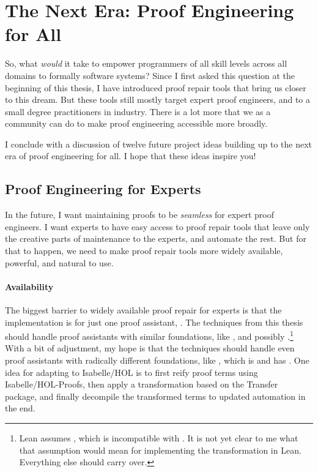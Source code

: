 \section*{The Next Era: Proof Engineering for All}



So, what \textit{would} it take to empower programmers of all skill levels across all domains to formally  software systems?
Since I first asked this question at the beginning of this thesis, I have introduced proof repair tools that bring us closer to this dream.
But these tools still mostly target expert proof engineers, and to a small degree practitioners in industry.
There is a lot more that we as a community can do to make proof engineering accessible more broadly.

I conclude with a discussion of twelve future project ideas building up to the next era of proof engineering for all.
I hope that these ideas inspire you!

\subsection*{Proof Engineering for Experts}

In the future, I want maintaining proofs to be \emph{seamless} for expert proof engineers.
I want experts to have easy access to proof repair tools that leave only the creative parts of maintenance to the experts, and automate the rest.
But for that to happen, we need to make proof repair tools more widely available, powerful, and natural to use.

\paragraph{Availability}
The biggest barrier to widely available proof repair for experts is that the implementation is for just one proof assistant, .
The techniques from this thesis should handle proof assistants with similar foundations, like ,
and possibly .\footnote{Lean assumes , which is incompatible with .
It is not yet clear to me what that assumption would mean for implementing the \toolnamec transformation in Lean.
Everything else should carry over.}
With a bit of adjustment, my hope is that the techniques should handle even proof assistants with radically different foundations,
like , which is  and has .
One idea for adapting \toolnamec to Isabelle/HOL is to first reify proof terms using Isabelle/HOL-Proofs,
then apply a transformation based on the Transfer~\cite{Huffman2013} package, and finally decompile the transformed terms to updated automation in the end.

